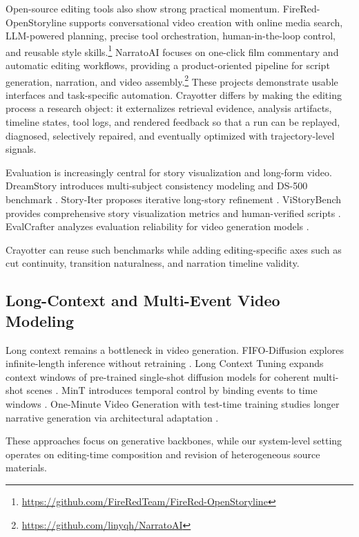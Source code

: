 ﻿\documentclass[11pt]{article}
\begin{document}
Open-source editing tools also show strong practical momentum.
FireRed-OpenStoryline supports conversational video creation with online media
search, LLM-powered planning, precise tool orchestration, human-in-the-loop
control, and reusable style skills.\footnote{\url{https://github.com/FireRedTeam/FireRed-OpenStoryline}} NarratoAI
focuses on one-click film commentary and automatic editing workflows, providing
a product-oriented pipeline for script generation, narration, and video
assembly.\footnote{\url{https://github.com/linyqh/NarratoAI}} These projects demonstrate usable interfaces and
task-specific automation. Crayotter differs by making the editing process a
research object: it externalizes retrieval evidence, analysis artifacts,
timeline states, tool logs, and rendered feedback so that a run can be replayed,
diagnosed, selectively repaired, and eventually optimized with trajectory-level
signals.

Evaluation is increasingly central for story visualization and long-form video.
DreamStory introduces multi-subject consistency modeling and DS-500 benchmark
\cite{dreamStory24}. Story-Iter proposes iterative long-story refinement
\cite{storyIter24}. ViStoryBench provides comprehensive story visualization
metrics and human-verified scripts \cite{viStoryBench26}. EvalCrafter analyzes
evaluation reliability for video generation models \cite{evalCrafter24}.

Crayotter can reuse such benchmarks while adding editing-specific axes such as
cut continuity, transition naturalness, and narration timeline validity.

\subsection{Long-Context and Multi-Event Video Modeling}

Long context remains a bottleneck in video generation. FIFO-Diffusion explores
infinite-length inference without retraining \cite{fifo24}. Long Context Tuning
expands context windows of pre-trained single-shot diffusion models for coherent
multi-shot scenes \cite{lct25}. MinT introduces temporal control by binding
events to time windows \cite{mint25}. One-Minute Video Generation with test-time
training studies longer narrative generation via architectural adaptation
\cite{oneMinute25}.

These approaches focus on generative backbones, while our system-level setting
operates on editing-time composition and revision of heterogeneous source
materials.
\end{document}
